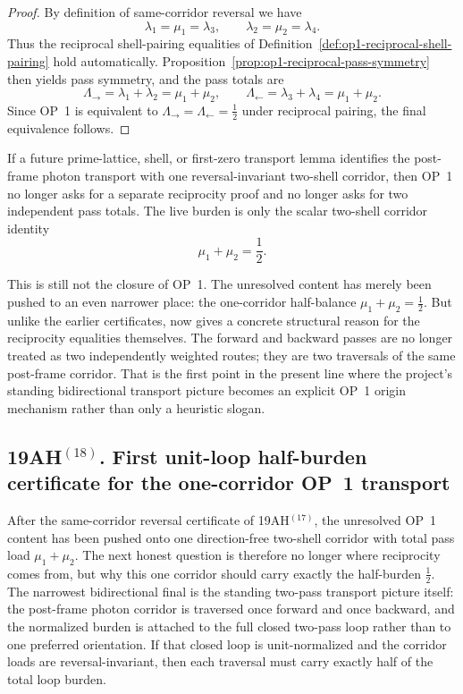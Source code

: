 \begin{proof}
By definition of same-corridor reversal we have
\[
 \lambda_1=\mu_1=\lambda_3,
 \qquad
 \lambda_2=\mu_2=\lambda_4.
\]
Thus the reciprocal shell-pairing equalities of Definition~\ref{def:op1-reciprocal-shell-pairing} hold automatically. Proposition~\ref{prop:op1-reciprocal-pass-symmetry} then yields pass symmetry, and the pass totals are
\[
 \Lambda_{\rightarrow}=\lambda_1+\lambda_2=\mu_1+\mu_2,
 \qquad
 \Lambda_{\leftarrow}=\lambda_3+\lambda_4=\mu_1+\mu_2.
\]
Since OP~1 is equivalent to \(\Lambda_{\rightarrow}=\Lambda_{\leftarrow}=\tfrac12\) under reciprocal pairing, the final equivalence follows.
\end{proof}

\begin{corollary}
\label{cor:op1-live-burden-after-r07}
If a future prime-lattice, shell, or first-zero transport lemma identifies the post-frame photon transport with one reversal-invariant two-shell corridor, then OP~1 no longer asks for a separate reciprocity proof and no longer asks for two independent pass totals. The live burden is only the scalar two-shell corridor identity
\[
 \mu_1+\mu_2=\frac12.
\]
\end{corollary}

\begin{remark}
This is still not the closure of OP~1. The unresolved content has merely been pushed to an even narrower place: the one-corridor half-balance \(\mu_1+\mu_2=\tfrac12\). But unlike the earlier certificates, now gives a concrete structural reason for the reciprocity equalities themselves. The forward and backward passes are no longer treated as two independently weighted routes; they are two traversals of the same post-frame corridor. That is the first point in the present line where the project's standing bidirectional transport picture becomes an explicit OP~1 origin mechanism rather than only a heuristic slogan.
\end{remark}



\subsection*{19AH$^{(18)}$. First unit-loop half-burden certificate for the one-corridor OP~1 transport}
After the same-corridor reversal certificate of 19AH$^{(17)}$, the unresolved OP~1 content has been pushed onto one direction-free two-shell corridor with total pass load \(\mu_1+\mu_2\). The next honest question is therefore no longer where reciprocity comes from, but why this one corridor should carry exactly the half-burden \(\tfrac12\). The narrowest bidirectional final is the standing two-pass transport picture itself: the post-frame photon corridor is traversed once forward and once backward, and the normalized burden is attached to the full closed two-pass loop rather than to one preferred orientation. If that closed loop is unit-normalized and the corridor loads are reversal-invariant, then each traversal must carry exactly half of the total loop burden.

